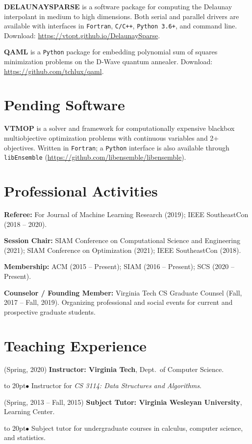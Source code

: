 \documentclass[12pt]{article}
\def\bullitem{\par\hangindent=15pt \hangafter=1
\noindent\hbox to 20pt{\hfil$\bullet$\hfil}\ignorespaces}
\begin{document}
\textbf{DELAUNAYSPARSE} is a software package for computing the Delaunay
interpolant in medium to high dimensions.
Both serial and parallel drivers are available with interfaces in
\texttt{Fortran},
\texttt{C/C++},
\texttt{Python 3.6+},
and command line.
Download: \url{https://vtopt.github.io/DelaunaySparse}.

\textbf{QAML} is a \texttt{Python} package for embedding polynomial sum of
squares minimization problems on the D-Wave quantum annealer.
Download: \url{https://github.com/tchlux/qaml}.

\section*{Pending Software}

\textbf{VTMOP} is a solver and framework for computationally
expensive blackbox multiobjective optimization problems with continuous
variables and 2+ objectives.
Written in \texttt{Fortran}; a \texttt{Python} interface is also available
through \texttt{libEnsemble} (\url{https://github.com/libensemble/libensemble}).


\section*{Professional Activities}

\textbf{Referee:} For
Journal of Machine Learning Research (2019);
IEEE SoutheastCon (2018 -- 2020).

\textbf{Session Chair:}
SIAM Conference on Computational Science and Engineering (2021);
SIAM Conference on Optimization (2021); IEEE SoutheastCon (2018).

\textbf{Membership:}
ACM (2015 -- Present); SIAM (2016 -- Present); SCS (2020 -- Present).

\textbf{Counselor / Founding Member:} Virginia Tech CS Graduate Counsel 
(Fall, 2017 -- Fall, 2019).
Organizing professional and social events for
current and prospective graduate students.

\section*{Teaching Experience}

\hangindent=0.3in
(Spring, 2020)
\textbf{Instructor: Virginia Tech}, Dept.\ of Computer Science.
\bullitem
Instructor for {\it CS 3114: Data Structures and Algorithms}.

\medskip

\hangindent=0.3in
(Spring, 2013 -- Fall, 2015)
\textbf{Subject Tutor: Virginia Wesleyan University},
Learning Center.
\bullitem
Subject tutor for undergraduate courses in calculus, computer science, and
statistics.
\end{document}
